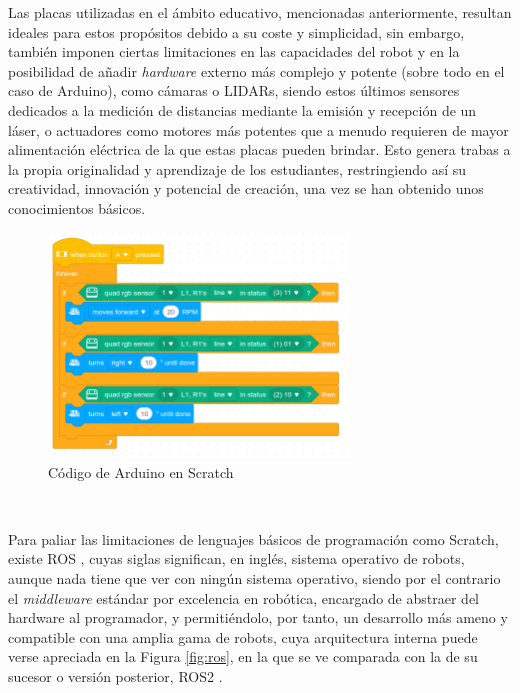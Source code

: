 Las placas utilizadas en el ámbito educativo, mencionadas anteriormente,
resultan ideales para estos propósitos debido a su coste y simplicidad, sin
embargo, también imponen ciertas limitaciones en las capacidades del robot y en
la posibilidad de añadir \textit{hardware} externo más complejo y potente (sobre
todo en el caso de Arduino), como cámaras o LIDARs, siendo estos últimos
sensores dedicados a la medición de distancias mediante la emisión y recepción
de un láser, o actuadores como motores más potentes que a menudo requieren de
mayor alimentación eléctrica de la que estas placas pueden brindar.
Esto genera trabas a la propia originalidad y aprendizaje de los estudiantes,
restringiendo así su creatividad, innovación y potencial de creación, una vez se
han obtenido unos conocimientos básicos.

\begin{figure} [h!]
  \begin{center}
    \includegraphics[width=8cm]{figs/scratch_arduino_code}
  \end{center}
  \caption{Código de Arduino en Scratch \cite{arduino_scratch_code}}
  \label{fig:scratch}
\end{figure}\

Para paliar las limitaciones de lenguajes básicos de programación como Scratch,
existe ROS \cite{ros}, cuyas siglas significan, en inglés, sistema operativo
de robots, aunque nada tiene que ver con ningún sistema operativo, siendo por el
contrario el \textit{middleware} estándar por excelencia en robótica, encargado
de abstraer del hardware al programador, y permitiéndolo, por tanto, un
desarrollo más ameno y compatible con una amplia gama de robots, cuya
arquitectura interna puede verse apreciada en la Figura \ref{fig:ros}, en la que
se ve comparada con la de su sucesor o versión posterior, ROS2 \cite{ros2}.
\\

